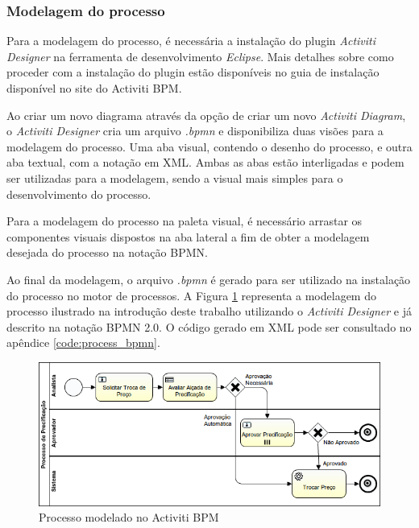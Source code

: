 \subsubsection{Modelagem do processo}\label{sec:automatizacao_processos-modelagem_processo}

Para a modelagem do processo, é necessária a instalação do plugin \textit{Activiti Designer} na ferramenta de desenvolvimento \textit{Eclipse}\cite{eclipse}. Mais detalhes sobre como proceder com a instalação do plugin estão disponíveis no guia de instalação disponível no site\cite{activiti_designer} do Activiti BPM.

Ao criar um novo diagrama através da opção de criar um novo \textit{Activiti Diagram}, o \textit{Activiti Designer} cria um arquivo \textit{.bpmn} e disponibiliza duas visões para a modelagem do processo. Uma aba visual, contendo o desenho do processo, e outra aba textual, com a notação em XML. Ambas as abas estão interligadas e podem ser utilizadas para a modelagem, sendo a visual mais simples para o desenvolvimento do processo.

Para a modelagem do processo na paleta visual, é necessário arrastar os componentes visuais dispostos na aba lateral a fim de obter a modelagem desejada do processo na notação BPMN.

Ao final da modelagem, o arquivo \textit{.bpmn} é gerado para ser utilizado na instalação do processo no motor de processos. A Figura \ref{fig:processo_precificacao} representa a modelagem 
do processo ilustrado na introdução deste trabalho utilizando o \textit{Activiti Designer} e já descrito na notação BPMN 2.0. O código gerado em XML pode ser consultado no apêndice \ref{code:process_bpmn}.

\begin{figure}[H]
\centering
\includegraphics[width=1.0\textwidth]{imagens/ProcessoDePrecificacao}
\caption{Processo modelado no Activiti BPM}
\label{fig:processo_precificacao}
\end{figure}

